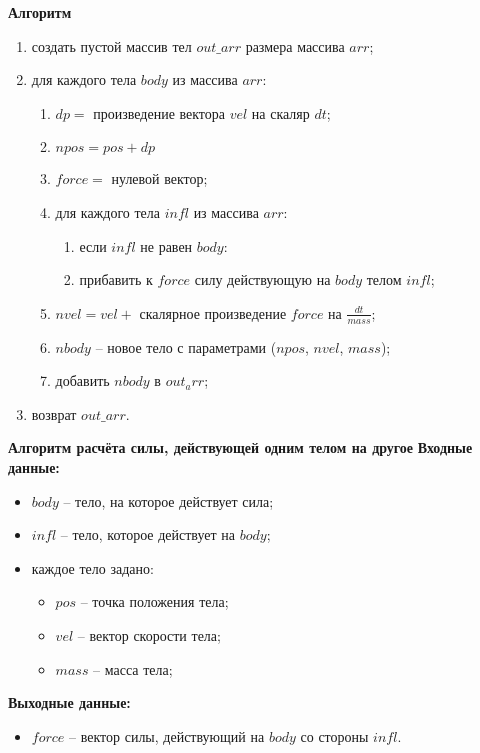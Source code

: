 \textbf{Алгоритм}
\begin{enumerate}
	\item создать пустой массив тел $out\_arr$ размера массива $arr$;
	\item для каждого тела $body$ из массива $arr$:
	\begin{enumerate}
		\item $dp = $ произведение вектора $vel$ на скаляр $dt$;
		\item $npos = pos + dp$
		\item $force = $ нулевой вектор;
		\item для каждого тела $infl$ из массива $arr$:
		\begin{enumerate}
			\item если $infl$ не равен $body$:
			\item прибавить к $force$ силу действующую на  $body$ телом $infl$;
		\end{enumerate}
		\item $nvel = vel + $ скалярное произведение $force$ на $\frac{dt}{mass}$;
		\item $nbody$ -- новое тело с параметрами ($npos$, $nvel$, $mass$);
		\item добавить $nbody$ в $out_arr$;
	\end{enumerate}
	\item возврат $out\_arr$.
\end{enumerate}

\textbf{Алгоритм расчёта силы, действующей одним телом на другое}
\textbf{Входные данные:}
\begin{itemize}
	\item $body$ -- тело, на которое действует сила;
	\item $infl$ -- тело, которое действует на $body$;
	\item каждое тело задано:
	\begin{itemize}
		\item $pos$ -- точка положения тела;
		\item $vel$ -- вектор скорости тела;
		\item $mass$ -- масса тела;
	\end{itemize}
\end{itemize}

\textbf{Выходные данные:}
\begin{itemize}
	\item $force$ -- вектор силы, действующий на $body$ со стороны $infl$.
\end{itemize}

